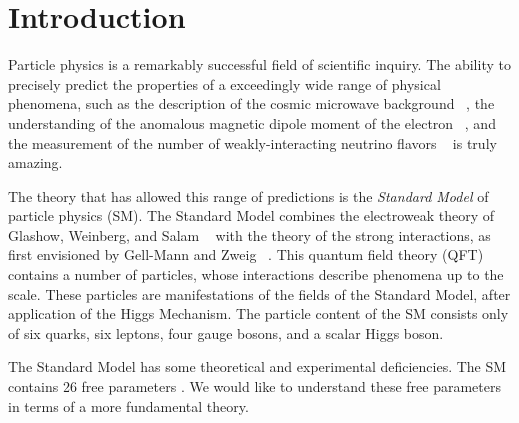 
\chapter{Introduction}


Particle physics is a remarkably successful field of scientific inquiry.
The ability to precisely predict the properties of a exceedingly wide range of physical phenomena, such as the description of the cosmic microwave background ~\cite{Perdereau:2016akt,Aghanim:2016sns}, the understanding of the anomalous magnetic dipole moment of the electron ~\cite{Schwinger:1948iu, Laporta:1996mq}, and the measurement of the number of weakly-interacting neutrino flavors ~\cite{ALEPH:2005ab} is truly amazing.

The theory that has allowed this range of predictions is the \textit{Standard Model} of particle physics (SM).
The Standard Model combines the electroweak theory of Glashow, Weinberg, and Salam ~\cite{Glashow:1961tr, Weinberg:1967tq,  Salam:1968rm} with the theory of the strong interactions, as first envisioned by Gell-Mann and Zweig ~\cite{GellMann:1964nj, Zweig:1964jf}.
This quantum field theory (QFT) contains a number of particles, whose interactions describe phenomena up to the \TeV\xspace scale.
These particles are manifestations of the fields of the Standard Model, after application of the Higgs Mechanism.
The particle content of the SM consists only of six quarks, six leptons, four gauge bosons, and a scalar Higgs boson.

The Standard Model has some theoretical and experimental deficiencies.
The SM contains 26 free parameters \footnotemark.
We would like to understand these free parameters in terms of a more fundamental theory.

